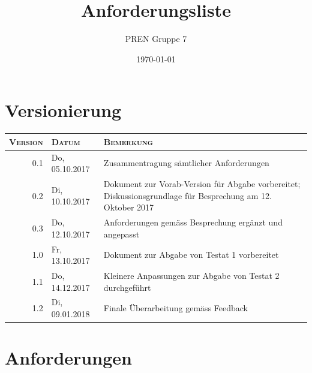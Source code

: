 \documentclass[a4paper,11pt]{scrartcl}
\begin{document}
\author{PREN Gruppe 7}
\title{Anforderungsliste}
\date{\today}

\maketitle

\section*{Versionierung}

\def\arraystretch{1.2}
\begin{tabularx}{\textwidth}{|r|l|X|}
\hline
\textsc{Version} & \textsc{Datum} & \textsc{Bemerkung} \\
\hline
0.1 & Do, 05.10.2017 & Zusammentragung sämtlicher Anforderungen \\
0.2 & Di, 10.10.2017 & Dokument zur Vorab-Version für Abgabe vorbereitet; Diskussionsgrundlage für Besprechung am 12. Oktober 2017 \\
0.3 & Do, 12.10.2017 & Anforderungen gemäss Besprechung ergänzt und angepasst \\
1.0 & Fr, 13.10.2017 & Dokument zur Abgabe von Testat 1 vorbereitet \\
1.1 & Do, 14.12.2017 & Kleinere Anpassungen zur Abgabe von Testat 2 durchgeführt \\
1.2 & Di, 09.01.2018 & Finale Überarbeitung gemäss Feedback \\
\hline
\end{tabularx}

\newpage

\section{Anforderungen}
\end{document}
